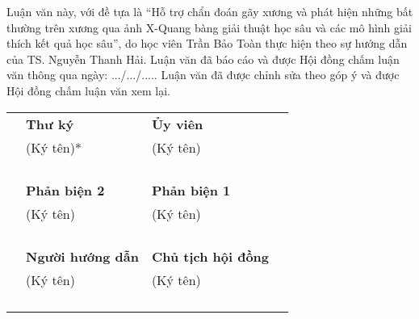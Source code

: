 \documentclass[./thesis.tex]{subfiles}
\begin{document}
{\fontsize{13}{12} \selectfont
Luận văn này, với đề tựa là “Hỗ trợ chẩn đoán gãy xương và phát hiện những bất thường trên xương qua ảnh X-Quang bàng giải thuật học sâu và các mô hình giải thích kết quả học sâu”, do học viên Trần Bảo Toàn thực hiện theo sự hướng dẫn của TS. Nguyễn Thanh Hải. Luận văn đã báo cáo và được Hội đồng chấm luận văn thông qua ngày: .../.../..... Luận văn đã được chỉnh sửa theo góp ý và được Hội đồng chấm luận văn xem lại.
}


\begin{table}[h!]
\centering
\begin{tabularx}{\columnwidth}{cXXc}

&\textbf{Thư ký} & \textbf{Ủy viên}&\\ 
&(Ký tên)* & (Ký tên)&\\ 
\\ 
\\
\\
\\
&\textbf{Phản biện 2} & \textbf{Phản biện 1}&\\ 
&(Ký tên) & (Ký tên)\\ 
\\ 
\\
\\
\\
&\textbf{Người hướng dẫn} & \textbf{Chủ tịch hội đồng}&\\ 
&(Ký tên) & (Ký tên)&\\ 
\\ 
\\
\\
\\
\end{tabularx}
\end{table}
\end{document}
